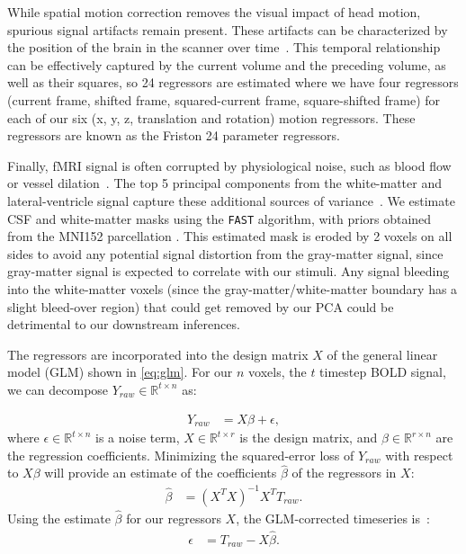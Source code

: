 \documentclass[11pt]{article}
\begin{document}
While spatial motion correction removes the visual impact of head motion, spurious signal artifacts remain present. These artifacts can be characterized by the position of the brain in the scanner over time~\cite{Friston1996}. This temporal relationship can be effectively captured by the current volume and the preceding volume, as well as their squares, so 24 regressors are estimated where we have four regressors (current frame, shifted frame, squared-current frame, square-shifted frame) for each of our six (x, y, z, translation and rotation) motion regressors. These regressors are known as the Friston 24 parameter regressors.

Finally,  fMRI signal is often corrupted by physiological noise,  such as blood flow or vessel dilation~\cite{Behzadi2007}. The top 5 principal components from the white-matter and lateral-ventricle signal capture these additional sources of variance~\cite{Behzadi2007,Ciric2017174}. We estimate CSF and white-matter masks using the \texttt{FAST} algorithm, \cite{Zhang2001} with priors obtained from the MNI152 parcellation \cite{mni152}. This estimated mask is eroded by 2 voxels on all sides to avoid any potential signal distortion from the gray-matter signal, since gray-matter signal is expected to correlate with our stimuli.  Any signal bleeding into the white-matter voxels (since the gray-matter/white-matter boundary has a slight bleed-over region) that could get removed by our PCA could be detrimental to our downstream inferences.

The regressors are incorporated into the design matrix $X$ of the general linear model (GLM) shown in \ref{eq:glm}. For our $n$ voxels, the $t$ timestep BOLD signal, we can decompose $Y_{raw} \in \mathbb{R}^{t \times n}$ as:

\begin{align}
    Y_{raw} &= X\beta + \epsilon, 
    \label{eq:glm}
\end{align}
\noindent
where $\epsilon \in \mathbb{R}^{t \times n}$ is a noise term,   $X \in \mathbb{R}^{t \times r}$ is the design matrix, and  $\beta \in \mathbb{R}^{r \times n}$ are the regression coefficients. Minimizing the squared-error loss of $Y_{raw}$ with respect to $X\beta$ will provide an estimate of the coefficients $\hat{\beta}$ of the regressors in $X$:
\begin{align*}
    \hat{\beta} &= (X^TX)^{-1}X^TT_{raw}.
\end{align*}
\noindent
Using the estimate $\hat{\beta}$ for our regressors $X$, the GLM-corrected timeseries is~\cite{Tanabe}:
\begin{align*}
    \epsilon &= T_{raw} - X\hat{\beta}.
\end{align*}
\end{document}
